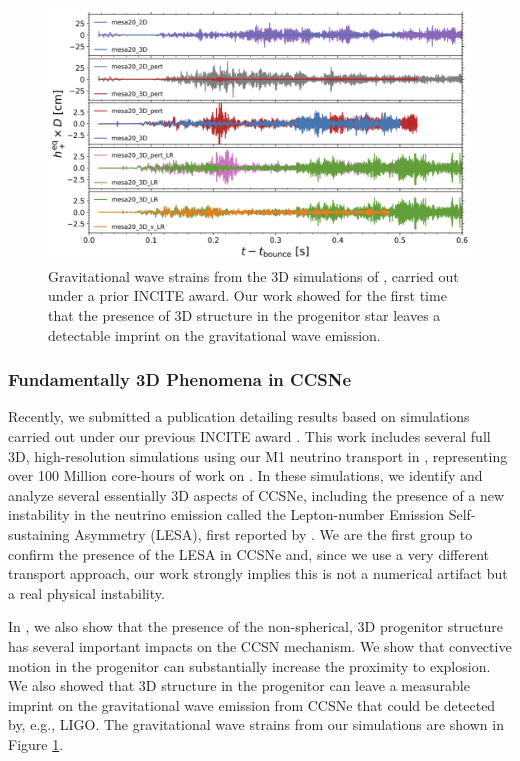\documentclass[12pt]{article}
\begin{document}
\begin{figure}
    \includegraphics[width=6in]{./gw_trains.png}
    \caption{Gravitational wave strains from the 3D simulations of \citet{oconnor:2018}, carried out under a prior INCITE award. Our work showed for the first time that the presence of 3D structure in the progenitor star leaves a detectable imprint on the gravitational wave emission.}
    \label{f.strains}
  \end{figure}
  
  \subsubsection{Fundamentally 3D Phenomena in CCSNe}
  
  Recently, we submitted a publication detailing results based on simulations carried out under our previous INCITE award \citep{oconnor:2018b}.
  This work includes several full 3D, high-resolution simulations using our M1 neutrino transport in \flash, representing over 100 Million core-hours of work on \mira.
  In these simulations, we identify and analyze several essentially 3D aspects of CCSNe, including the presence of a new instability in the neutrino emission called the Lepton-number Emission Self-sustaining Asymmetry (LESA), first reported by \citep{tamborra:2014}. 
  We are the first group to confirm the presence of the LESA in CCSNe and, since we use a very different transport approach, our work strongly implies this is not a numerical artifact but a real physical instability. 
  
  In \citet{oconnor:2018}, we also show that the presence of the non-spherical, 3D progenitor structure has several important impacts on the CCSN mechanism. 
  We show that convective motion in the progenitor can substantially increase the proximity to explosion.
  We also showed that 3D structure in the progenitor can leave a measurable imprint on the gravitational wave emission from CCSNe that could be detected by, e.g., LIGO. 
  The gravitational wave strains from our simulations are shown in Figure \ref{f.strains}.
  
\end{document}

